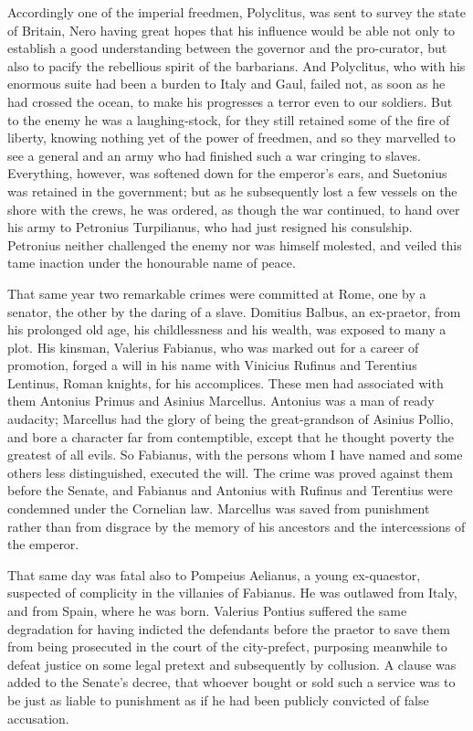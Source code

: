 
Accordingly one of the imperial freedmen, Polyclitus, was sent to survey the state of Britain, Nero having great hopes that his influence would be able not only to establish a good understanding between the governor and the pro-curator, but also to pacify the rebellious spirit of the barbarians. And Polyclitus, who with his enormous suite had been a burden to Italy and Gaul, failed not, as soon as he had crossed the ocean, to make his progresses a terror even to our soldiers. But to the enemy he was a laughing-stock, for they still retained some of the fire of liberty, knowing nothing yet of the power of freedmen, and so they marvelled to see a general and an army who had finished such a war cringing to slaves. Everything, however, was softened down for the emperor's ears, and Suetonius was retained in the government; but as he subsequently lost a few vessels on the shore with the crews, he was ordered, as though the war continued, to hand over his army to Petronius Turpilianus, who had just resigned his consulship. Petronius neither challenged the enemy nor was himself molested, and veiled this tame inaction under the honourable name of peace.


That same year two remarkable crimes were committed at Rome, one by a senator, the other by the daring of a slave. Domitius Balbus, an ex-praetor, from his prolonged old age, his childlessness and his wealth, was exposed to many a plot. His kinsman, Valerius Fabianus, who was marked out for a career of promotion, forged a will in his name with Vinicius Rufinus and Terentius Lentinus, Roman knights, for his accomplices. These men had associated with them Antonius Primus and Asinius Marcellus. Antonius was a man of ready audacity; Marcellus had the glory of being the great-grandson of Asinius Pollio, and bore a character far from contemptible, except that he thought poverty the greatest of all evils. So Fabianus, with the persons whom I have named and some others less distinguished, executed the will. The crime was proved against them before the Senate, and Fabianus and Antonius with Rufinus and Terentius were condemned under the Cornelian law. Marcellus was saved from punishment rather than from disgrace by the memory of his ancestors and the intercessions of the emperor.


That same day was fatal also to Pompeius Aelianus, a young ex-quaestor, suspected of complicity in the villanies of Fabianus. He was outlawed from Italy, and from Spain, where he was born. Valerius Pontius suffered the same degradation for having indicted the defendants before the praetor to save them from being prosecuted in the court of the city-prefect, purposing meanwhile to defeat justice on some legal pretext and subsequently by collusion. A clause was added to the Senate's decree, that whoever bought or sold such a service was to be just as liable to punishment as if he had been publicly convicted of false accusation.

